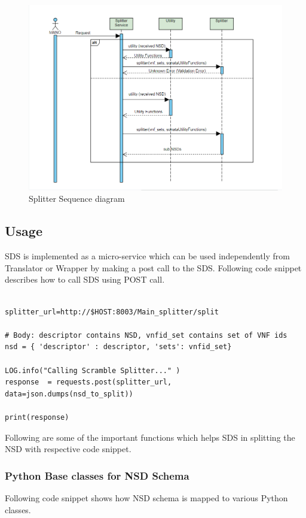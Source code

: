 \begin{figure}
	\centering
	\includegraphics[width=1\linewidth]{figures/splitter_sequence_diagram}
	\caption{Splitter Sequence diagram}
	\label{fig:splittersequencediagram}
\end{figure}



\subsection{Usage}

SDS is implemented as a micro-service which can be used independently from Translator or Wrapper by making a post call to the SDS. Following code snippet describes how to call SDS using POST call.

\begin{lstlisting}[caption=POST call to SDS, label=lis:postSDS]

splitter_url=http://$HOST:8003/Main_splitter/split

# Body: descriptor contains NSD, vnfid_set contains set of VNF ids
nsd = { 'descriptor' : descriptor, 'sets': vnfid_set}

LOG.info("Calling Scramble Splitter..." )
response  = requests.post(splitter_url,
data=json.dumps(nsd_to_split))

print(response)

\end{lstlisting}

Following are some of the important functions which helps SDS in splitting the NSD with respective code snippet.

\subsubsection{Python Base classes for NSD Schema} Following code snippet shows how NSD schema is mapped to various Python classes.

